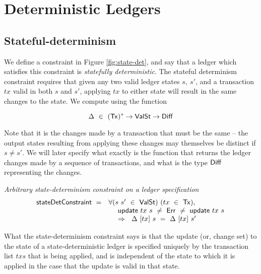 \section{Deterministic Ledgers}
\label{sec:determinism}

\subsection{Stateful-determinism}
\label{sec:state-det}

We define a constraint in Figure \ref{fig:state-det}, and say that a ledger which
satisfies this constraint is \emph{statefully deterministic}.
The stateful determinism constraint requires that given any two valid ledger states $s,~s'$,
and a transaction $tx$ valid in both $s$ and $s'$, applying $tx$ to either state will result in the same
changes to the state. We compute using the function

\[ \Delta~\in~(\mathsf{Tx})^{*} \to \mathsf{ValSt} \to \mathsf{Diff} \]

Note that it is the changes made by a transaction that must be
the same -- the output states resulting from applying these changes may themselves
be distinct if $s \neq s'$.
We will later specify what exactly is the function that returns the ledger changes
made by a sequence of transactions, and what is the type $\mathsf{Diff}$ representing the changes.

\begin{figure*}[htb]
  \emph{Arbitrary state-determinism constraint on a ledger specification}
  \begin{equation*}
    \begin{array}{l@{~~}l@{~~}ll}
    \fun{stateDetConstraint} ~=~ & \forall (s~s'~\in~\type{ValSt})~(tx~\in~\type{Tx}),~\\
    & ~~~~\ups~tx~s~\neq~\Err~\neq~\ups~tx~s \\
    & ~~~~\Rightarrow~~\Delta~[tx]~s~=~\Delta~[tx]~s'
    \end{array}
  \end{equation*}
  \caption{State-determinism}
  \label{fig:state-det}
\end{figure*}


What the state-determinism constraint says is that the update (or, change set)
to the state of a state-deterministic ledger is specified uniquely by the transaction list
$txs$ that is being applied, and is independent of the state to which it is applied in the
case that the update is valid in that state.

